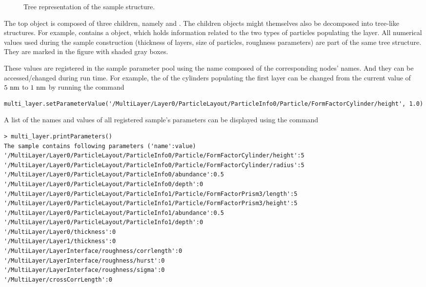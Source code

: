 \begin{figure}[p!]
\begin{tikzpicture}[%
  grow via three points={one child at (0.5,-0.7) and
  two children at (0.5,-0.7) and (0.5,-1.4)},
  edge from parent path={(\tikzparentnode.south) |- (\tikzchildnode.west)}]
\end{tikzpicture}
\caption{Tree representation of the sample structure.}
\label{fig:sample_tree}
\end{figure}


The top  object is composed of three children, namely
 and . The
children objects might themselves also be decomposed into tree-like structures. For example,
 contains a  object, which holds information
related to the two types of particles populating the layer. All numerical values used
during the sample construction (thickness of layers, size of particles, roughness parameters) are part of the same tree structure.
They are marked in the figure with shaded gray boxes.

These values are registered in the sample parameter pool using the name
composed of the corresponding nodes' names. And they can be accessed/changed
during run time. For example, the  of the cylinders
populating the first layer can be changed from the
current value of $5~\rm{nm}$ to $1~\rm{nm}$ by running the command

\begin{lstlisting}[language=shell, style=commandline]
multi_layer.setParameterValue('/MultiLayer/Layer0/ParticleLayout/ParticleInfo0/Particle/FormFactorCylinder/height', 1.0)
\end{lstlisting}


A list of the names and values of all registered sample's parameters
can be displayed using the command

\begin{lstlisting}[language=shell, style=commandline]
> multi_layer.printParameters()
The sample contains following parameters ('name':value)
'/MultiLayer/Layer0/ParticleLayout/ParticleInfo0/Particle/FormFactorCylinder/height':5
'/MultiLayer/Layer0/ParticleLayout/ParticleInfo0/Particle/FormFactorCylinder/radius':5
'/MultiLayer/Layer0/ParticleLayout/ParticleInfo0/abundance':0.5
'/MultiLayer/Layer0/ParticleLayout/ParticleInfo0/depth':0
'/MultiLayer/Layer0/ParticleLayout/ParticleInfo1/Particle/FormFactorPrism3/length':5
'/MultiLayer/Layer0/ParticleLayout/ParticleInfo1/Particle/FormFactorPrism3/height':5
'/MultiLayer/Layer0/ParticleLayout/ParticleInfo1/abundance':0.5
'/MultiLayer/Layer0/ParticleLayout/ParticleInfo1/depth':0
'/MultiLayer/Layer0/thickness':0
'/MultiLayer/Layer1/thickness':0
'/MultiLayer/LayerInterface/roughness/corrlength':0
'/MultiLayer/LayerInterface/roughness/hurst':0
'/MultiLayer/LayerInterface/roughness/sigma':0
'/MultiLayer/crossCorrLength':0
\end{lstlisting}

